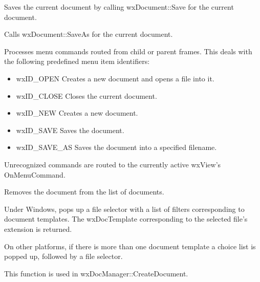 
Saves the current document by calling wxDocument::Save for the current document.



Calls wxDocument::SaveAs for the current document.



Processes menu commands routed from child or parent frames. This deals
with the following predefined menu item identifiers:

\begin{itemize}\itemsep=0pt
\item wxID\_OPEN Creates a new document and opens a file into it.
\item wxID\_CLOSE Closes the current document.
\item wxID\_NEW Creates a new document.
\item wxID\_SAVE Saves the document.
\item wxID\_SAVE\_AS Saves the document into a specified filename.
\end{itemize}

Unrecognized commands are routed to the currently active wxView's OnMenuCommand.



Removes the document from the list of documents.



Under Windows, pops up a file selector with a list of filters corresponding to document templates.
The wxDocTemplate corresponding to the selected file's extension is returned.

On other platforms, if there is more than one document template a choice list is popped up,
followed by a file selector.

This function is used in wxDocManager::CreateDocument.


